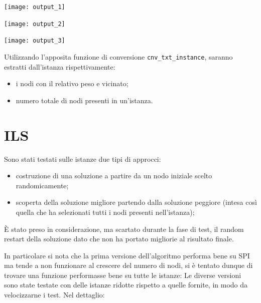 \documentclass[11pt]{article}
\begin{document}
\begin{center}
\begin{minipage}{0.48\linewidth}
\texttt{[image: output\_1]}
\end{minipage}%
\begin{minipage}{0.49\linewidth}
\texttt{[image: output\_2]}
\end{minipage}
\begin{minipage}{0.49\linewidth}
\texttt{[image: output\_3]}
\end{minipage}
\end{center}

Utilizzando l'apposita funzione di conversione \verb|cnv_txt_instance|, saranno estratti dall'istanza rispettivamente:
\begin{itemize}
\item{i nodi con il relativo peso e vicinato;}
\item{numero totale di nodi presenti in un'istanza.}
\end{itemize}

\pagebreak

\section{ILS}

Sono stati testati sulle istanze due tipi di approcci:

\begin{itemize}
\item{costruzione di una soluzione a partire da un nodo iniziale scelto randomicamente;}
\item {scoperta della soluzione migliore partendo dalla soluzione peggiore (intesa così quella che ha selezionati tutti i nodi presenti nell'istanza);}
\end{itemize}

È stato preso in considerazione, ma scartato durante la fase di test, il random restart della soluzione dato che non ha portato migliorie al risultato finale.

In particolare si nota che la prima versione dell'algoritmo performa bene su SPI ma tende a non funzionare al crescere del numero di nodi, si è tentato dunque di trovare una funzione performasse bene su tutte le istanze:
Le diverse versioni sono state testate con delle istanze ridotte rispetto a quelle fornite, in modo da velocizzarne i test.
Nel dettaglio:
\end{document}
